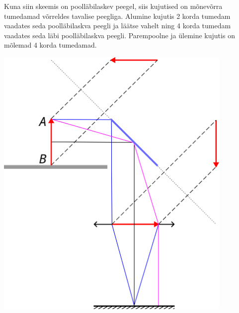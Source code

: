 Kuna siin skeemis on poolläbilaskev peegel, siis kujutised on mõnevõrra tumedamad võrreldes tavalise peegliga. Alumine kujutis 2 korda tumedam vaadates seda poolläbilaskva peegli ja läätse vahelt ning 4 korda tumedam vaadates seda läbi poolläbilaskva peegli. Parempoolne ja ülemine kujutis on mõlemad 4 korda tumedamad.
\begin{center}
  \includegraphics[width=0.86\textwidth]{2023-v3g-03-yl.png}
\end{center}
\probend